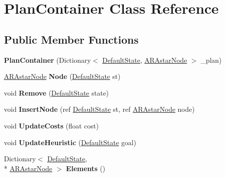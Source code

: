 \hypertarget{class_plan_container}{\section{Plan\-Container Class Reference}
\label{class_plan_container}
}
\subsection*{Public Member Functions}
\begin{DoxyCompactItemize}
\item 
\hypertarget{class_plan_container_af4eac8ba49af8845098657fbce70bd5c}{{\bfseries Plan\-Container} (Dictionary$<$ \hyperlink{class_default_state}{Default\-State}, \hyperlink{class_a_r_astar_node}{A\-R\-Astar\-Node} $>$ \-\_\-plan)}\label{class_plan_container_af4eac8ba49af8845098657fbce70bd5c}

\item 
\hypertarget{class_plan_container_a1c5b054eddfff18de7d02631a4babdfd}{\hyperlink{class_a_r_astar_node}{A\-R\-Astar\-Node} {\bfseries Node} (\hyperlink{class_default_state}{Default\-State} st)}\label{class_plan_container_a1c5b054eddfff18de7d02631a4babdfd}

\item 
\hypertarget{class_plan_container_a7fd7f8b92671e2a0f64d2bde1b508809}{void {\bfseries Remove} (\hyperlink{class_default_state}{Default\-State} state)}\label{class_plan_container_a7fd7f8b92671e2a0f64d2bde1b508809}

\item 
\hypertarget{class_plan_container_a055275bf8a2330996670c669ec23f89f}{void {\bfseries Insert\-Node} (ref \hyperlink{class_default_state}{Default\-State} st, ref \hyperlink{class_a_r_astar_node}{A\-R\-Astar\-Node} node)}\label{class_plan_container_a055275bf8a2330996670c669ec23f89f}

\item 
\hypertarget{class_plan_container_a91e41d4fd5a34c3cf958f0940dfb8d10}{void {\bfseries Update\-Costs} (float cost)}\label{class_plan_container_a91e41d4fd5a34c3cf958f0940dfb8d10}

\item 
\hypertarget{class_plan_container_a16e1e615e844f1164867046b526b3ef1}{void {\bfseries Update\-Heuristic} (\hyperlink{class_default_state}{Default\-State} goal)}\label{class_plan_container_a16e1e615e844f1164867046b526b3ef1}

\item 
\hypertarget{class_plan_container_a317026e533d9ccc429cc7552cbaf0a86}{Dictionary$<$ \hyperlink{class_default_state}{Default\-State}, \\*
\hyperlink{class_a_r_astar_node}{A\-R\-Astar\-Node} $>$ {\bfseries Elements} ()}\label{class_plan_container_a317026e533d9ccc429cc7552cbaf0a86}


\end{DoxyCompactItemize}
